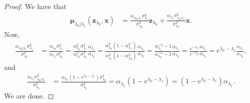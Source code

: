 \documentclass[10pt]{article}
\newcommand{\ve}[1]{\mathbf{#1}}
\newcommand{\ves}[1]{\boldsymbol{#1}}
\begin{document}
\begin{itemize}
\begin{proof}
  We have that
  \begin{align*}
    \ves{\mu}_{\lambda_0|\lambda_1} (\ve{z}_{\lambda_0}, \ve{x})
    &= \frac{\alpha_{\lambda_0|\lambda_1} \sigma_{\lambda_1}^2}{\sigma_{\lambda_0}^2} \ve{z}_{\lambda_0} + \frac{\alpha_{\lambda_1} \sigma^2_{\lambda_0|\lambda_1}}{\sigma^2_{\lambda_0}} \ve{x}.
  \end{align*}
  Now,
  \begin{align*}
    \frac{\alpha_{\lambda_0|\lambda_1} \sigma_{\lambda_1}^2}{\sigma_{\lambda_0}^2}
    &= \frac{\alpha_{\lambda_0} \sigma_{\lambda_1}^2}{\alpha_{\lambda_1} \sigma^2_{\lambda_0}}
    = \frac{\alpha^2_{\lambda_0} \sigma_{\lambda_1}^2}{\alpha_{\lambda_1}^2 \sigma^2_{\lambda_0}} \frac{\alpha_{\lambda_1}}{\alpha_{\lambda_0}}
    = \frac{\alpha^2_{\lambda_0} (1 - \alpha_{\lambda_1}^2)}{\alpha_{\lambda_1}^2 (1-\alpha^2_{\lambda_0})} \frac{\alpha_{\lambda_1}}{\alpha_{\lambda_0}}
    = \frac{\alpha^{-2}_{\lambda_1} - 1}{\alpha^{-2}_{\lambda_0}-1} \frac{\alpha_{\lambda_1}}{\alpha_{\lambda_0}}
    = \frac{e^{-\lambda_1}}{e^{-\lambda_0}} \frac{\alpha_{\lambda_1}}{\alpha_{\lambda_0}}
    = e^{\lambda_0 - \lambda_1} \frac{\alpha_{\lambda_1}}{\alpha_{\lambda_0}},
  \end{align*}
  and
  \begin{align*}
    \frac{\alpha_{\lambda_1} \sigma^2_{\lambda_0|\lambda_1}}{\sigma^2_{\lambda_0}}
    &= \frac{\alpha_{\lambda_1}(1-e^{\lambda_0 - \lambda_1}) \sigma_{\lambda_0}^2}{\sigma^2_{\lambda_0}}
    = \alpha_{\lambda_1}(1-e^{\lambda_0 - \lambda_1})
    = (1-e^{\lambda_0 - \lambda_1})\alpha_{\lambda_1}.
  \end{align*}
  We are done.
\end{proof}
\end{itemize}


  
\end{document}
